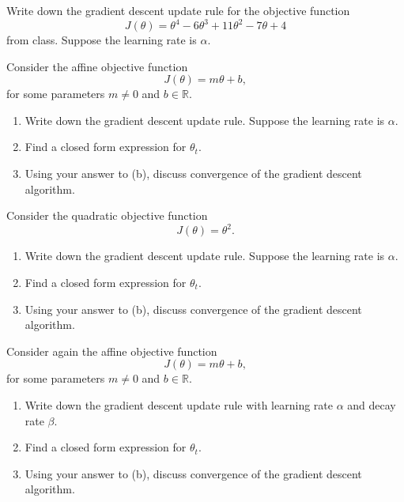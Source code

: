 \documentclass[12pt,reqno]{amsart}
\begin{document}
\bigskip

\prob Write down the gradient descent update rule for the objective function
	\[J(\theta) = \theta^4 - 6\theta^3 + 11 \theta^2 - 7\theta + 4
	\]
from class. Suppose the learning rate is $\alpha$.














\vfill
\prob Consider the affine objective function
	\[J(\theta) = m\theta + b,
	\]
for some parameters $m\neq 0$ and $b\in \mathbb{R}$.

\medskip
\begin{enumerate}
\item Write down the gradient descent update rule. Suppose the learning rate is $\alpha$.\vfill
\item Find a closed form expression for $\theta_{t}$.\vfill
\item Using your answer to (b), discuss convergence of the gradient descent algorithm.
\end{enumerate}















\vfill
\newpage
\prob Consider the quadratic objective function
	\[J(\theta) = \theta^2.
	\]

\begin{enumerate}
\item Write down the gradient descent update rule. Suppose the learning rate is $\alpha$.\vfill
\item Find a closed form expression for $\theta_t$.\vfill
\item Using your answer to (b), discuss convergence of the gradient descent algorithm.\vfill
\end{enumerate}










\prob Consider again the affine objective function
	\[J(\theta) = m\theta + b,
	\]
for some parameters $m\neq 0$ and $b\in \mathbb{R}$.

\medskip
\begin{enumerate}
\item Write down the gradient descent update rule with learning rate $\alpha$ and decay rate $\beta$.\vfill
\item Find a closed form expression for $\theta_t$.\vfill
\item Using your answer to (b), discuss convergence of the gradient descent algorithm.
\end{enumerate}
\end{document}
